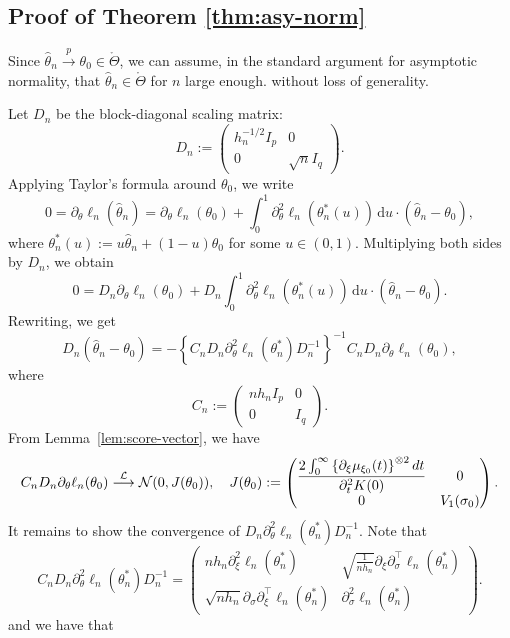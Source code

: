\documentclass[a4paper,10pt,twoside]{article}
\numberwithin{equation}{section}
\def\dis{\displaystyle}
\def\l{\left}
\def\r{\right}
\def\th{\theta}
\def\s{\sigma}
\def\p{\partial}
\def\toP{\stackrel{p}{\longrightarrow}}
\def\toD{\stackrel{{\cal L}}{\longrightarrow}}
\def\wh#1{\widehat{#1}}
\def\df{\mathrm{d}}
\begin{document}
\subsection{Proof of Theorem \ref{thm:asy-norm}}

Since $\wh{\th}_n\toP \th_0 \in \mathring{\Theta}$, we can assume, in the standard argument for asymptotic normality, 
that $\wh{\th}_n \in \mathring{\Theta}$ for $n$ large enough. without loss of generality. 

Let $D_n$ be the block-diagonal scaling matrix:
\[
D_n :=
\begin{pmatrix}
h_n^{-1/2} I_p & 0 \\
0 & \sqrt{n} I_q
\end{pmatrix}.
\]
Applying Taylor's formula around $\theta_0$, we write
\[
0 = \p_\theta \ell_n(\widehat{\theta}_n)
= \p_\theta \ell_n(\theta_0) + \int_0^1 \p_\theta^2 \ell_n(\theta_n^*(u))\,\df u \cdot (\widehat{\theta}_n - \theta_0),
\]
where $\theta_n^*(u) := u \widehat{\theta}_n + (1 - u) \theta_0$ for some $u \in (0, 1)$.
Multiplying both sides by $D_n$, we obtain
\[
0 = D_n \p_\theta \ell_n(\theta_0) + D_n\int_0^1 \p_\theta^2 \ell_n(\theta_n^*(u))\,\df u \cdot (\widehat{\theta}_n - \theta_0). 
\]
Rewriting, we get
\[
D_n (\widehat{\theta}_n - \theta_0)
= - \l\{C_nD_n \p_\theta^2 \ell_n(\theta_n^*) D_n^{-1} \r\}^{-1} C_nD_n \p_\theta \ell_n(\theta_0), 
\]
where 
\[
C_n :=
\begin{pmatrix}
nh_n I_p & 0 \\
0 &  I_q
\end{pmatrix}.
\]
From Lemma~\ref{lem:score-vector}, we have
\[
C_nD_n \p_\theta \ell_n(\theta_0) \toD \mathcal{N}(0, J(\theta_0)), \quad J(\theta_0) := 
\begin{pmatrix}
\dis  \frac{2\int_0^\infty \l\{ \partial_\xi \mu_{\xi_0}(t) \r\}^{\otimes 2} dt}{\partial_t^2 K(0)} &0 \\
0 & V_1(\s_0)
\end{pmatrix}. 
\]
It remains to show the convergence of $D_n \p_\theta^2 \ell_n(\theta_n^*) D_n^{-1}$. Note that 
\[
C_nD_n \p_\theta^2 \ell_n(\theta_n^*) D_n^{-1}
=
\begin{pmatrix}
nh_n \p_\xi^2 \ell_n(\theta_n^*) & \sqrt{\frac{1}{nh_n}} \p_\xi \p_\sigma^\top \ell_n(\theta_n^*) \\
\sqrt{nh_n} \p_\sigma \p_\xi^\top \ell_n(\theta_n^*) & \p_\sigma^2 \ell_n(\theta_n^*)
\end{pmatrix}.
\]
and we have that 
\end{document}
